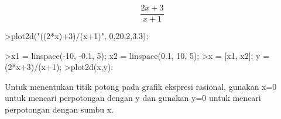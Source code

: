 \documentclass{article}
\begin{document}
\begin{eulernotebook}
\begin{eulercomment}
\begin{eulercomment}
\begin{eulercomment}
\begin{eulercomment}
\begin{eulercomment}
\begin{eulercomment}
\begin{eulercomment}
\end{eulercomment}
\begin{eulerformula}
\[
\frac{2x+3}{x+1}
\]
\end{eulerformula}
\begin{eulercomment}
\end{eulercomment}
\begin{eulerprompt}
>plot2d("((2*x)+3)/(x+1)", 0,20,2,3.3):
\end{eulerprompt}
\begin{eulerprompt}
>x1 = linspace(-10, -0.1, 5); x2 = linspace(0.1, 10, 5);
>x = [x1, x2]; y = (2*x+3)/(x+1);
>plot2d(x,y):
\end{eulerprompt}
\begin{eulercomment}
Untuk menentukan titik potong pada grafik ekspresi rasional, gunakan
x=0 untuk mencari perpotongan dengan y dan gunakan y=0 untuk mencari
perpotongan dengan sumbu x.


\end{eulercomment}
\end{eulercomment}
\end{eulercomment}
\end{eulercomment}
\end{eulercomment}
\end{eulercomment}
\end{eulercomment}
\end{eulernotebook}
\end{document}
